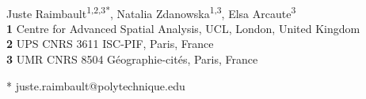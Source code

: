 \documentclass[10pt,letterpaper]{article}
\begin{document}
\justify
\vspace*{0.2in}

\begin{flushleft}
{\Large
\textbf{} %
}
\newline
\\
Juste Raimbault\textsuperscript{1,2,3*},
Natalia Zdanowska\textsuperscript{1,3},
Elsa Arcaute\textsuperscript{3}
\\
\bigskip
\textbf{1} Centre for Advanced Spatial Analysis, UCL, London, United Kingdom
\\
\textbf{2} UPS CNRS 3611 ISC-PIF, Paris, France
\\
\textbf{3} UMR CNRS 8504 G{\'e}ographie-cit{\'e}s, Paris, France
\\
\bigskip

* juste.raimbault@polytechnique.edu

\end{flushleft}

\end{document}
